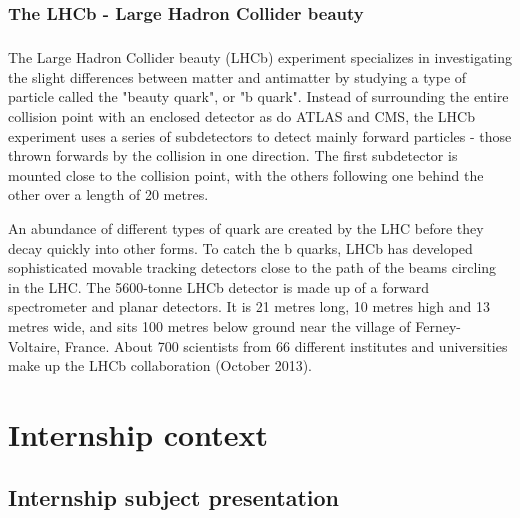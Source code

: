 \documentclass[../main.tex]{subfiles}
\begin{document}
\subsection{The LHCb - Large Hadron Collider beauty}
\paragraph{}
The Large Hadron Collider beauty (LHCb) experiment specializes in investigating the slight differences between matter and antimatter by studying a type of particle called the "beauty quark", or "b quark".
Instead of surrounding the entire collision point with an enclosed detector as do ATLAS and CMS, the LHCb experiment uses a series of subdetectors to detect mainly forward particles - those thrown forwards by the collision in one direction. The first subdetector is mounted close to the collision point, with the others following one behind the other over a length of 20 metres.
\par \noindent \newline
An abundance of different types of quark are created by the LHC before they decay quickly into other forms. To catch the b quarks, LHCb has developed sophisticated movable tracking detectors close to the path of the beams circling in the LHC. The 5600-tonne LHCb detector is made up of a forward spectrometer and planar detectors. It is 21 metres long, 10 metres high and 13 metres wide, and sits 100 metres below ground near the village of Ferney-Voltaire, France. About 700 scientists from 66 different institutes and universities make up the LHCb collaboration (October 2013).

\chapter{Internship context}
\section{Internship subject presentation}
\end{document}
